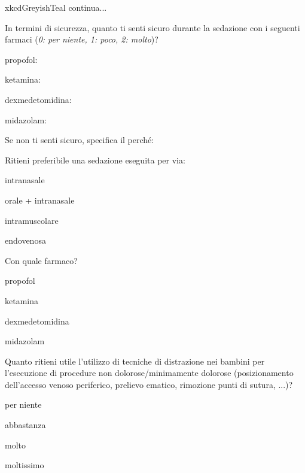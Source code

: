 \begin{survey}{xkcdGreyishTeal}
      \hfill continua...
       
       \newpage
       
       \Query In termini di sicurezza, quanto ti senti sicuro durante la sedazione con i seguenti farmaci (\emph{0: per niente, 1: poco, 2: molto})?
       
           propofol: \hfill {}
           
           ketamina: \hfill {}
           
           dexmedetomidina: \hfill {}
           
           midazolam: \hfill {}
    
       \bigskip 
       Se non ti senti sicuro, specifica il perché:
       
       \Query Ritieni preferibile una sedazione eseguita per via:
       \begin{Qlist}
           \item intranasale
           \item orale + intranasale
           \item intramuscolare
           \item endovenosa
       \end{Qlist}
       
       \bigskip
       
       Con quale farmaco? 
       \begin{Qlist}
            \item propofol
            \item ketamina
            \item dexmedetomidina
            \item midazolam
       \end{Qlist}

       

       \Query Quanto ritieni utile l’utilizzo di tecniche di distrazione nei bambini per l’esecuzione di procedure non dolorose/minimamente dolorose (posizionamento dell'accesso venoso periferico, prelievo ematico, rimozione punti di sutura, ...)?
       \begin{Qlist}
           \item per niente
           \item abbastanza
           \item molto
           \item moltissimo
       \end{Qlist}
       

\end{survey}

